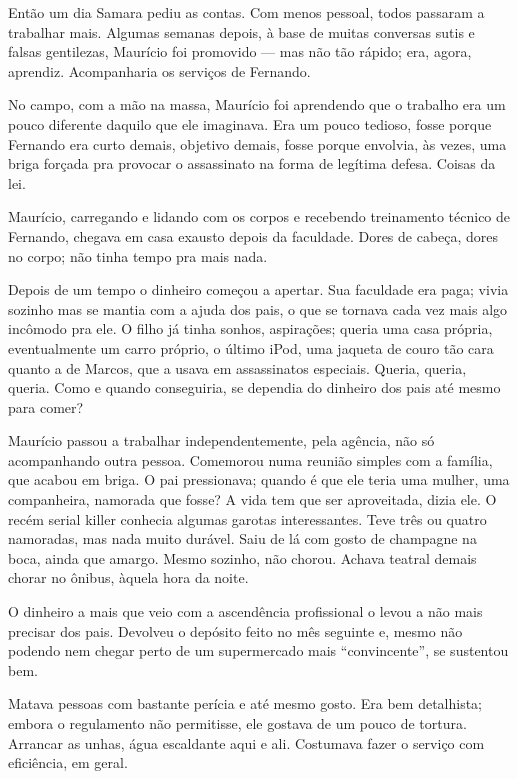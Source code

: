 Então um dia Samara pediu as contas. Com menos pessoal, todos passaram a trabalhar mais. Algumas semanas depois, à base de muitas conversas sutis e falsas gentilezas, Maurício foi promovido --- mas não tão rápido; era, agora, aprendiz. Acompanharia os serviços de Fernando.

No campo, com a mão na massa, Maurício foi aprendendo que o trabalho era um pouco diferente daquilo que ele imaginava. Era um pouco tedioso, fosse porque Fernando era curto demais, objetivo demais, fosse porque envolvia, às vezes, uma briga forçada pra provocar o assassinato na forma de legítima defesa. Coisas da lei.

Maurício, carregando e lidando com os corpos e recebendo treinamento técnico de Fernando, chegava em casa exausto depois da faculdade. Dores de cabeça, dores no corpo; não tinha tempo pra mais nada.

Depois de um tempo o dinheiro começou a apertar. Sua faculdade era paga; vivia sozinho mas se mantia com a ajuda dos pais, o que se tornava cada vez mais algo incômodo pra ele. O filho já tinha sonhos, aspirações; queria uma casa pró\-pri\-a, eventualmente um carro próprio, o último iPod, uma jaqueta de couro tão cara quanto a de Marcos, que a usava em assassinatos especiais. Queria, queria, queria. Como e quando conseguiria, se dependia do dinheiro dos pais até mesmo para comer?

\begin{sloppypar}
Maurício passou a trabalhar independentemente, pela agência, não só acompanhando outra pessoa. Comemorou numa reunião simples com a família, que acabou em briga. O pai pressionava; quando é que ele teria uma mulher, uma companheira, namorada que fosse? A vida tem que ser aproveitada, dizia ele. O recém \foreignlanguage{english}{serial killer} conhecia algumas garotas interessantes. Teve três ou quatro namoradas, mas nada muito durável. Saiu de lá com gosto de champagne na boca, ainda que amargo. Mesmo sozinho, não chorou. Achava teatral demais chorar no ônibus, àquela hora da noite.
\end{sloppypar}

O dinheiro a mais que veio com a ascendência profissional o levou a não mais precisar dos pais. Devolveu o depósito feito no mês seguinte e, mesmo não podendo nem chegar perto de um supermercado mais ``convincente'', se sustentou bem.

Matava pessoas com bastante perícia e até mesmo gosto. Era bem detalhista; embora o regulamento não permitisse, ele gostava de um pouco de tortura. Arrancar as unhas, água escaldante aqui e ali. Costumava fazer o serviço com eficiência, em geral.

